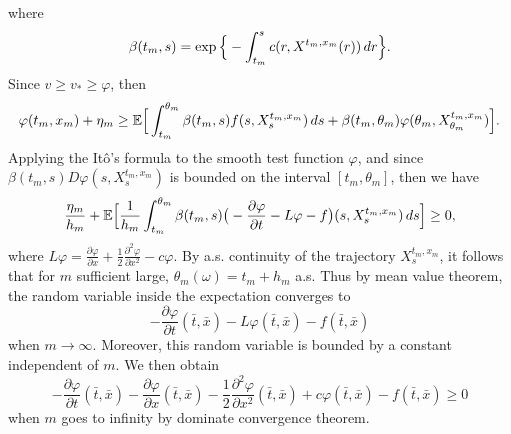 \documentclass[12pt,a4paper]{ctexart}
\begin{document}
where
\begin{equation*}
    \beta(t_m, s) = \exp \Big{\{} - \int_{t_m}^{s} c(r, X^{t_m, x_m}(r)) \, d r \Big{\}}.
\end{equation*}
Since $v \geq v_{*} \geq \varphi$, then
\begin{equation*}
    \varphi(t_m, x_m) + \eta_m \geq \mathbb{E} \Big{[} \int_{t_m}^{\theta_m} \beta(t_m, s) f(s, X_{s}^{t_m, x_m}) \, d s + \beta(t_m, \theta_m) \varphi (\theta_m, X_{\theta_m}^{t_m, x_m}) \Big{]}.
\end{equation*}
Applying the It\^{o}'s formula to the smooth test function $\varphi$, and since $\beta(t_m, s) D \varphi(s, X_{s}^{t_m, x_m})$ is bounded on the interval $[t_m, \theta_m]$, then we have
\begin{equation*}
    \frac{\eta_m}{h_m} + \mathbb{E} \Big{[} \frac{1}{h_m} \int_{t_m}^{\theta_m} \beta(t_m, s) \big{(} - \frac{\partial \varphi}{\partial t} - L \varphi - f \big{)} (s, X_{s}^{t_m, x_m}) \, d s  \Big{]} \geq 0,
\end{equation*}
where $L \varphi = \frac{\partial \varphi}{\partial x} + \frac{1}{2} \frac{\partial^{2} \varphi}{\partial x^{2}} - c \varphi$. By a.s. continuity of the trajectory $X_{s}^{t_m, x_m}$, it follows that for $m$ sufficient large, $\theta_{m}(\omega) = t_{m} + h_{m}$ a.s. Thus by mean value theorem, the random variable inside the expectation converges to
\begin{equation*}
    - \frac{\partial \varphi}{\partial t} (\bar t, \bar x) - L \varphi (\bar t, \bar x) - f(\bar t, \bar x)
\end{equation*}
when $m \to \infty$. Moreover, this random variable is bounded by a constant independent of $m$. We then obtain
\begin{equation}
    - \frac{\partial \varphi}{\partial t} (\bar t, \bar x) - \frac{\partial \varphi}{\partial x} (\bar t, \bar x) - \frac{1}{2} \frac{\partial^{2} \varphi}{\partial x^{2}} (\bar t, \bar x) + c \varphi (\bar t, \bar x) - f(\bar t, \bar x) \geq 0
\end{equation}
when $m$ goes to infinity by dominate convergence theorem.

\vspace{4pt}
\end{document}
